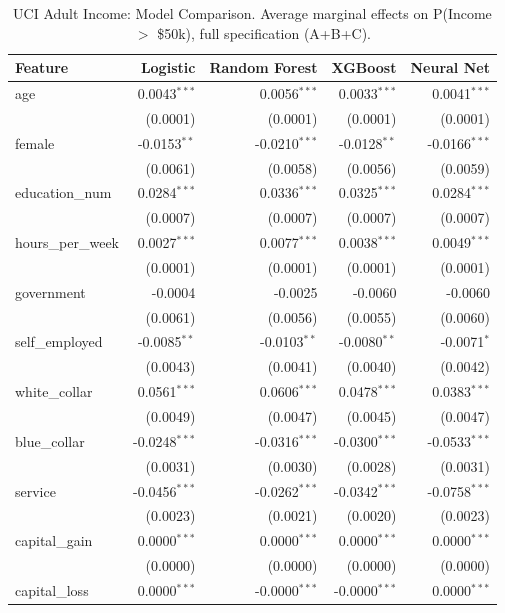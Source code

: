 \begin{table}[htbp]
\centering
\small
\begin{threeparttable}
\caption{UCI Adult Income: Model Comparison. Average marginal effects on P(Income $>$ \$50k), full specification (A+B+C).}
\label{tab:adult_model_comparison}
\begin{tabular}{lrrrr}
\toprule
Feature & Logistic & Random Forest & XGBoost & Neural Net \\
\midrule
age & 0.0043$^{***}$ & 0.0056$^{***}$ & 0.0033$^{***}$ & 0.0041$^{***}$ \\
 & (0.0001) & (0.0001) & (0.0001) & (0.0001) \\
female & -0.0153$^{**}$ & -0.0210$^{***}$ & -0.0128$^{**}$ & -0.0166$^{***}$ \\
 & (0.0061) & (0.0058) & (0.0056) & (0.0059) \\
education\_num & 0.0284$^{***}$ & 0.0336$^{***}$ & 0.0325$^{***}$ & 0.0284$^{***}$ \\
 & (0.0007) & (0.0007) & (0.0007) & (0.0007) \\
\midrule
hours\_per\_week & 0.0027$^{***}$ & 0.0077$^{***}$ & 0.0038$^{***}$ & 0.0049$^{***}$ \\
 & (0.0001) & (0.0001) & (0.0001) & (0.0001) \\
government & -0.0004 & -0.0025 & -0.0060 & -0.0060 \\
 & (0.0061) & (0.0056) & (0.0055) & (0.0060) \\
self\_employed & -0.0085$^{**}$ & -0.0103$^{**}$ & -0.0080$^{**}$ & -0.0071$^{*}$ \\
 & (0.0043) & (0.0041) & (0.0040) & (0.0042) \\
white\_collar & 0.0561$^{***}$ & 0.0606$^{***}$ & 0.0478$^{***}$ & 0.0383$^{***}$ \\
 & (0.0049) & (0.0047) & (0.0045) & (0.0047) \\
blue\_collar & -0.0248$^{***}$ & -0.0316$^{***}$ & -0.0300$^{***}$ & -0.0533$^{***}$ \\
 & (0.0031) & (0.0030) & (0.0028) & (0.0031) \\
service & -0.0456$^{***}$ & -0.0262$^{***}$ & -0.0342$^{***}$ & -0.0758$^{***}$ \\
 & (0.0023) & (0.0021) & (0.0020) & (0.0023) \\
\midrule
capital\_gain & 0.0000$^{***}$ & 0.0000$^{***}$ & 0.0000$^{***}$ & 0.0000$^{***}$ \\
 & (0.0000) & (0.0000) & (0.0000) & (0.0000) \\
capital\_loss & 0.0000$^{***}$ & -0.0000$^{***}$ & -0.0000$^{***}$ & 0.0000$^{***}$ \\

\end{tabular}
\end{threeparttable}
\end{table}
